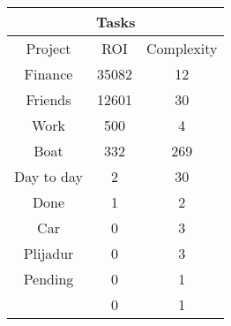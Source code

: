 \begin{longtable}{|c|c|c|}
\hline
\multicolumn{3}{|c|}{Tasks} \\
\hline
Project & ROI & Complexity \\
\hline
Finance & 35082 & 12\\
\hline
Friends & 12601 & 30\\
\hline
Work & 500 & 4\\
\hline
Boat & 332 & 269\\
\hline
Day to day & 2 & 30\\
\hline
Done & 1 & 2\\
\hline
Car & 0 & 3\\
\hline
Plijadur & 0 & 3\\
\hline
Pending & 0 & 1\\
\hline
 & 0 & 1\\
\hline
\end{longtable}
